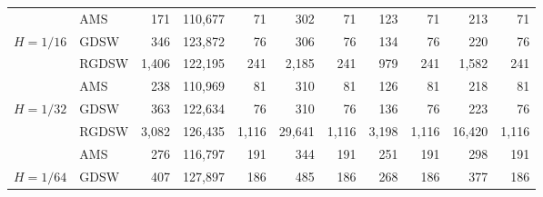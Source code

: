 \begin{table}[H]
\begin{tabular}{llrrrrrrrrr}
\cline{2-11}
\bfseries  & AMS & 171 & {\cellcolor[HTML]{E2E4FB}} \color[HTML]{000000} 110,677 & 71 & {\cellcolor[HTML]{ACB8F4}} \color[HTML]{000000} 302 & 71 & {\cellcolor[HTML]{768BEC}} \color[HTML]{F1F1F1} 123 & 71 & {\cellcolor[HTML]{405FE5}} \color[HTML]{F1F1F1} 213 & 71 \\
\cline{1-11} \cline{2-11}
\multirow[c]{3}{*}{\bfseries $H=1/16$} & GDSW & 346 & {\cellcolor[HTML]{E2E4FB}} \color[HTML]{000000} 123,872 & 76 & {\cellcolor[HTML]{405FE5}} \color[HTML]{F1F1F1} 306 & 76 & {\cellcolor[HTML]{ACB8F4}} \color[HTML]{000000} 134 & 76 & {\cellcolor[HTML]{768BEC}} \color[HTML]{F1F1F1} 220 & 76 \\
\cline{2-11}
\bfseries  & RGDSW & 1,406 & {\cellcolor[HTML]{E2E4FB}} \color[HTML]{000000} 122,195 & 241 & {\cellcolor[HTML]{ACB8F4}} \color[HTML]{000000} 2,185 & 241 & {\cellcolor[HTML]{768BEC}} \color[HTML]{F1F1F1} 979 & 241 & {\cellcolor[HTML]{405FE5}} \color[HTML]{F1F1F1} 1,582 & 241 \\
\cline{2-11}
\bfseries  & AMS & 238 & {\cellcolor[HTML]{E2E4FB}} \color[HTML]{000000} 110,969 & 81 & {\cellcolor[HTML]{768BEC}} \color[HTML]{F1F1F1} 310 & 81 & {\cellcolor[HTML]{ACB8F4}} \color[HTML]{000000} 126 & 81 & {\cellcolor[HTML]{405FE5}} \color[HTML]{F1F1F1} 218 & 81 \\
\cline{1-11} \cline{2-11}
\multirow[c]{3}{*}{\bfseries $H=1/32$} & GDSW & 363 & {\cellcolor[HTML]{E2E4FB}} \color[HTML]{000000} 122,634 & 76 & {\cellcolor[HTML]{405FE5}} \color[HTML]{F1F1F1} 310 & 76 & {\cellcolor[HTML]{ACB8F4}} \color[HTML]{000000} 136 & 76 & {\cellcolor[HTML]{768BEC}} \color[HTML]{F1F1F1} 223 & 76 \\
\cline{2-11}
\bfseries  & RGDSW & 3,082 & {\cellcolor[HTML]{E2E4FB}} \color[HTML]{000000} 126,435 & 1,116 & {\cellcolor[HTML]{ACB8F4}} \color[HTML]{000000} 29,641 & 1,116 & {\cellcolor[HTML]{405FE5}} \color[HTML]{F1F1F1} 3,198 & 1,116 & {\cellcolor[HTML]{768BEC}} \color[HTML]{F1F1F1} 16,420 & 1,116 \\
\cline{2-11}
\bfseries  & AMS & 276 & {\cellcolor[HTML]{E2E4FB}} \color[HTML]{000000} 116,797 & 191 & {\cellcolor[HTML]{ACB8F4}} \color[HTML]{000000} 344 & 191 & {\cellcolor[HTML]{768BEC}} \color[HTML]{F1F1F1} 251 & 191 & {\cellcolor[HTML]{405FE5}} \color[HTML]{F1F1F1} 298 & 191 \\
\cline{1-11} \cline{2-11}
\multirow[c]{3}{*}{\bfseries $H=1/64$} & GDSW & 407 & {\cellcolor[HTML]{E2E4FB}} \color[HTML]{000000} 127,897 & 186 & {\cellcolor[HTML]{768BEC}} \color[HTML]{F1F1F1} 485 & 186 & {\cellcolor[HTML]{ACB8F4}} \color[HTML]{000000} 268 & 186 & {\cellcolor[HTML]{405FE5}} \color[HTML]{F1F1F1} 377 & 186 \\

\end{tabular}
\end{table}
